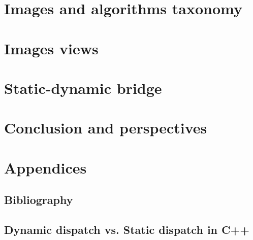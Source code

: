 \documentclass[11pt]{book}
\begin{document}


\cleardoublepage


\part{Images and algorithms taxonomy}
\label{part.image_and_algorithms_taxonomy}



\cleardoublepage


\part{Images views}
\label{part.image_views}



\cleardoublepage


\part{Static-dynamic bridge}
\label{part.static_dynamic_bridge}



\cleardoublepage


\part{Conclusion and perspectives}
\label{part.conclusion_and_perspecitves}



\cleardoublepage


\part{Appendices}
\label{part.annexes}

\appendix

\chapter{Bibliography}
\label{chap.bibliography}




\chapter{Dynamic dispatch vs. Static dispatch in C++}
\label{appendix.dispatch.dyn.static}


\end{document}

